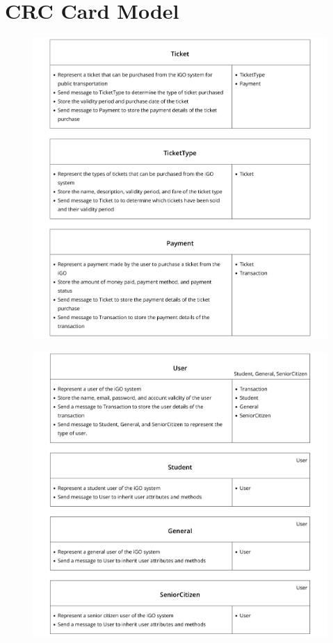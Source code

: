 \documentclass[a4paper, 11pt]{report}
\begin{document}
\section{CRC Card Model}
\begin{figure}[h]
  \includegraphics[width=\textwidth]{CRC-1.png} 
\end{figure}
\begin{figure}[t]
  \includegraphics[width=\textwidth]{CRC-2.png} 
\end{figure}
\end{document}
